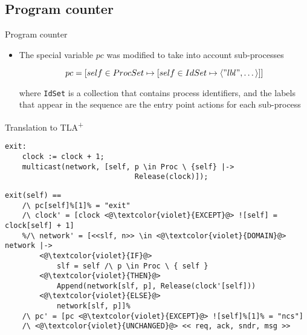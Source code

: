 \documentclass{beamer}
\newcommand{\tlaplus}{TLA\textsuperscript{+}\xspace}
\newcommand{\seq}[1]{\langle #1 \rangle}
\begin{document}
\subsection{Program counter}

\begin{frame}[fragile]{Program counter}
    \begin{itemize}
     \item The special variable $pc$ was modified to take into account sub-processes

\[
pc = [self \in ProcSet \mapsto [self \in IdSet \mapsto \seq{"lbl",\dots}]]
\]	

    where \verb|IdSet| is a collection that contains process identifiers, and the labels that appear in the sequence are the entry point actions for each sub-process

    \end{itemize}
\end{frame}

\begin{frame}[fragile]{Translation to \tlaplus}
 \begin{lstlisting}[language=pluscal, frame = tlrb, numbers=none]  
 exit:  
    clock := clock + 1;
    multicast(network, [self, p \in Proc \ {self} |->
                              Release(clock)]);
\end{lstlisting}


\begin{lstlisting}[language=pluscal, frame = tlrb, numbers=none]  
exit(self) == 
    /\ pc[self]%[1]% = "exit"
    /\ clock' = [clock <@\textcolor{violet}{EXCEPT}@> ![self] = clock[self] + 1]
    %/\ network' = [<<slf, n>> \in <@\textcolor{violet}{DOMAIN}@> network |->
        <@\textcolor{violet}{IF}@> 
            slf = self /\ p \in Proc \ { self } 
        <@\textcolor{violet}{THEN}@> 
            Append(network[slf, p], Release(clock'[self])) 
        <@\textcolor{violet}{ELSE}@>
            network[slf, p]]%
    /\ pc' = [pc <@\textcolor{violet}{EXCEPT}@> ![self]%[1]% = "ncs"]
    /\ <@\textcolor{violet}{UNCHANGED}@> << req, ack, sndr, msg >>
\end{lstlisting}
\end{frame}
\end{document}
